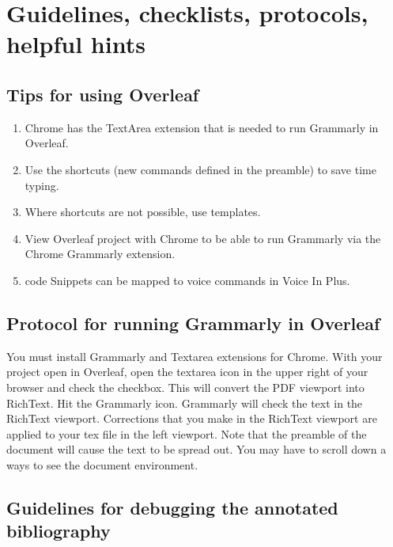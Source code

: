 \documentclass[10pt,letterpaper]{article}
\newcommand{\be}{\begin{enumerate}}
\newcommand{\ee}{\end{enumerate}}
\begin{document}
\begin{description}
    \item [ ]
    \item [ ]
    \item [ ]
    \item [ ]
\end{description}



\section{Guidelines, checklists, protocols, helpful hints}
\label{sec:guides}

\subsection{Tips for using Overleaf}
\label{subsec:guides:overleaf}


\be
\item Chrome has the TextArea extension that is needed to run Grammarly in Overleaf.
\item Use the shortcuts (new commands defined in the preamble) to save time typing.
\item Where shortcuts are not possible, use templates.
\item View Overleaf project with Chrome to be able to run Grammarly via the Chrome Grammarly extension.
\item code Snippets can be mapped to voice commands in Voice In Plus.
\ee 


\subsection{Protocol for running Grammarly in Overleaf}
\label{subsec:guides:grammarlyInoverleaf}

You must install Grammarly and Textarea extensions for Chrome.
With your project open in Overleaf, open the textarea icon in the upper right of your browser and check the checkbox.
This will convert the PDF viewport into RichText. 
Hit the Grammarly icon. 
Grammarly will check the text in the RichText viewport.
Corrections that you make in the RichText viewport are applied to your tex file in the left viewport.
Note that the preamble of the document will cause the text to be spread out.
You may have to scroll down a ways to see the document environment.


\subsection{Guidelines for debugging the annotated bibliography} 
\label{subsec:guides:annotDebug}
\end{document}
